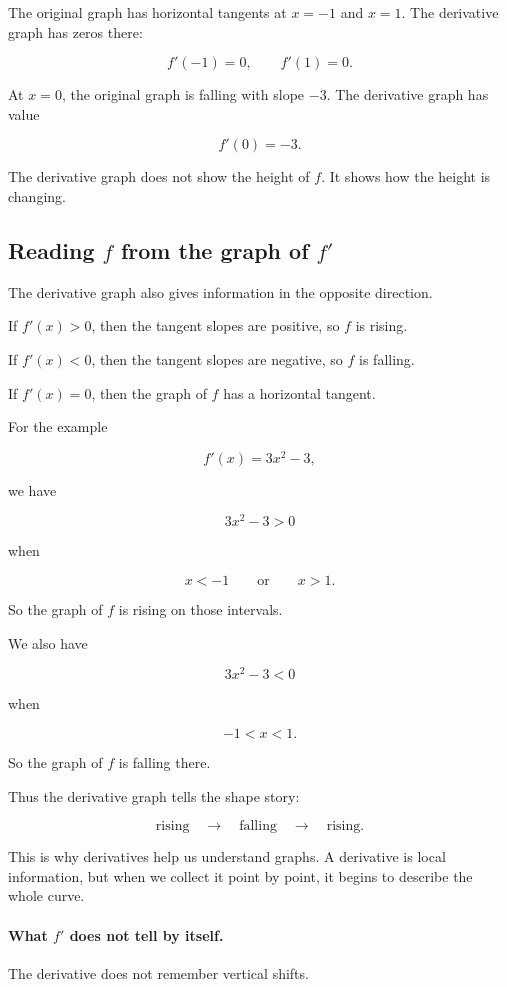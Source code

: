 The original graph has horizontal tangents at \(x=-1\) and \(x=1\).  The derivative graph has zeros there:

\[
f'(-1)=0,
\qquad
f'(1)=0.
\]

At \(x=0\), the original graph is falling with slope \(-3\).  The derivative graph has value

\[
f'(0)=-3.
\]

The derivative graph does not show the height of \(f\).  It shows how the height is changing.

\subsection{Reading \(f\) from the graph of \(f'\)}
\label{subsec:reading-function-from-derivative-graph}

The derivative graph also gives information in the opposite direction.

If \(f'(x)>0\), then the tangent slopes are positive, so \(f\) is rising.

If \(f'(x)<0\), then the tangent slopes are negative, so \(f\) is falling.

If \(f'(x)=0\), then the graph of \(f\) has a horizontal tangent.

For the example

\[
f'(x)=3x^2-3,
\]

we have

\[
3x^2-3>0
\]

when

\[
x<-1
\qquad\text{or}\qquad
x>1.
\]

So the graph of \(f\) is rising on those intervals.

We also have

\[
3x^2-3<0
\]

when

\[
-1<x<1.
\]

So the graph of \(f\) is falling there.

Thus the derivative graph tells the shape story:

\[
\text{rising} \quad \longrightarrow \quad \text{falling} \quad \longrightarrow \quad \text{rising}.
\]

This is why derivatives help us understand graphs.  A derivative is local information, but when we collect it point by point, it begins to describe the whole curve.

\paragraph{What \(f'\) does not tell by itself.}
The derivative does not remember vertical shifts.

